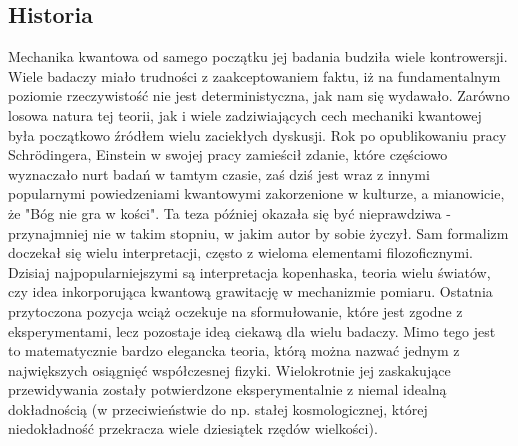 \documentclass[10pt]{article} %
\begin{document}
\subsection{Historia}
Mechanika kwantowa od samego początku jej badania budziła wiele kontrowersji. Wiele badaczy miało trudności z zaakceptowaniem faktu, iż
na fundamentalnym poziomie rzeczywistość nie jest deterministyczna, jak nam się wydawało. Zarówno losowa natura tej teorii, jak i wiele zadziwiających cech mechaniki kwantowej była początkowo źródłem wielu zaciekłych dyskusji. Rok po opublikowaniu pracy Schrödingera, Einstein w swojej pracy zamieścił zdanie, które częściowo wyznaczało nurt badań w tamtym czasie, zaś dziś jest wraz z innymi popularnymi powiedzeniami kwantowymi zakorzenione w kulturze, a mianowicie, że "Bóg nie gra w kości". Ta teza później okazała się być nieprawdziwa - przynajmniej nie w takim stopniu, w jakim autor by sobie życzył. Sam formalizm doczekał się wielu interpretacji, często z wieloma elementami filozoficznymi. Dzisiaj najpopularniejszymi są interpretacja kopenhaska, teoria wielu światów, czy idea inkorporująca kwantową grawitację w mechanizmie pomiaru. Ostatnia przytoczona pozycja wciąż oczekuje na sformułowanie, które jest zgodne z eksperymentami, lecz pozostaje ideą ciekawą dla wielu badaczy. Mimo tego jest to matematycznie bardzo elegancka teoria, którą można nazwać jednym z największych osiągnięć współczesnej fizyki. Wielokrotnie jej zaskakujące przewidywania zostały potwierdzone eksperymentalnie z niemal idealną dokładnością (w przeciwieństwie do np. stałej kosmologicznej, której niedokładność przekracza wiele dziesiątek rzędów wielkości). 
\end{document}
